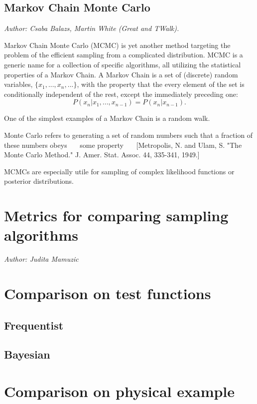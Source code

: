 \documentclass[12pt]{JHEP3}
\begin{document}
\subsection{Markov Chain Monte Carlo}
\label{sec:MCMC}
\emph{Author: Csaba Balazs, Martin White (Great and TWalk).} 

Markov Chain Monte Carlo (MCMC) is yet another method targeting the problem of the efficient sampling from a complicated distribution.  
%
MCMC is a generic name for a collection of specific algorithms, all utilizing the statistical properties of a Markov Chain.
%
A Markov Chain is a set of (discrete) random variables, $\{x_1, ..., x_n, ...\}$, with the property that the every element of the set is conditionally independent of the rest, except the immediately preceding one:
\begin{equation}
	P(x_n|x_1,...,x_{n-1}) = P(x_n|x_{n-1}) .
\end{equation}

One of the simplest examples of a Markov Chain is a random walk.

Monte Carlo refers to generating a set of random numbers such that a fraction of these numbers obeys ~~~some property~~~
[Metropolis, N. and Ulam, S. "The Monte Carlo Method." J. Amer. Stat. Assoc. 44, 335-341, 1949.]

MCMCs are especially utile for sampling of complex likelihood functions or posterior distributions. 

\section{Metrics for comparing sampling algorithms}
\label{sec:metrics}
\emph{Author: Judita Mamuzic}

\section{Comparison on test functions}
\label{sec:test}
\subsection{Frequentist}
\subsection{Bayesian}

\section{Comparison on physical example}
\label{sec:physics}
\end{document}
